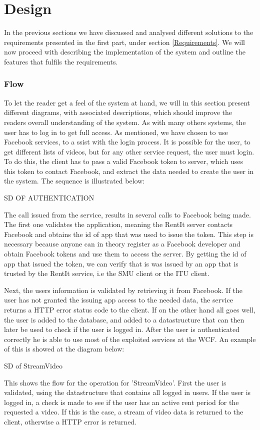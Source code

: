 \part{Design}
In the previous sections we have discussed and analysed different solutions to the requirements presented in the first part, under section \ref{Requirements}. We will now proceed with describing the implementation of the system and outline the features that fulfils the requirements.

\section{Flow}
To let the reader get a feel of the system at hand, we will in this section present different diagrams, with associated descriptions, which should improve the readers overall understanding of the system.
As with many others systems, the user has to log in to get full access. As mentioned, we have chosen to use Facebook services, to a ssist with the login process. It is possible for the user, to get different lists of videos, but for any other service request, the user must login. To do this, the client has to pass a valid Facebook token to server, which uses this token to contact Facebook, and extract the data needed to create the user in the system. The sequence is illustrated below:

SD OF AUTHENTICATION

The call issued from the service, results in several calls to Facebook being made. The first one validates the application, meaning the RentIt server contacts Facebook and obtains the id of app that was used to issue the token. This step is necessary because anyone can in theory register as a Facebook developer and obtain Facebook tokens and use them to access the server. By getting the id of app that issued the token, we can verify that is was issued by an app that is trusted by the RentIt service, i.e the SMU client or the ITU client.

Next, the users information is validated by retrieving it from Facebook. If the user has not granted the issuing app access to the needed data, the service returns a HTTP error status code to the client. If on the other hand all goes well, the user is added to the database, and added to a datastructure that can then later be used to check if the user is logged in.
After the user is authenticated correctly he is able to use most of the exploited services at the WCF. An example of this is showed at the diagram below:

SD of StreamVideo

This shows the flow for the operation for 'StreamVideo'. First the user is validated, using the datastructure that contains all logged in users. If the user is logged in, a check is made to see if the user has an active rent period for the requested a video. If this is the case, a stream of video data is returned to the client, otherwise a HTTP error is returned.

